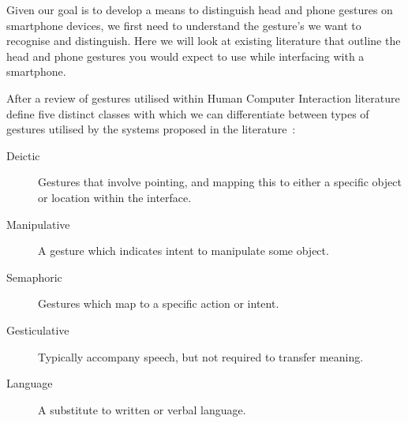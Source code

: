 


Given our goal is to develop a means to distinguish head and phone gestures on smartphone devices, we first need to understand the gesture's we want to recognise and distinguish.
Here we will look at existing literature that outline the head and phone gestures you would expect to use while interfacing with a smartphone.

%
After a review of gestures utilised within Human Computer Interaction literature \citeauthor{karam2005taxonomy} define five distinct classes with which we can differentiate between types of gestures utilised by the systems proposed in the literature~\cite{karam2005taxonomy}:
\begin{description}
    \item[Deictic] Gestures that involve pointing, and mapping this to either a specific object or location within the interface.
    \item[Manipulative] A gesture which indicates intent to manipulate some object.
    \item[Semaphoric] Gestures which map to a specific action or intent.
    \item[Gesticulative] Typically accompany speech, but not required to transfer meaning.
    \item[Language] A substitute to written or verbal language.
\end{description}

